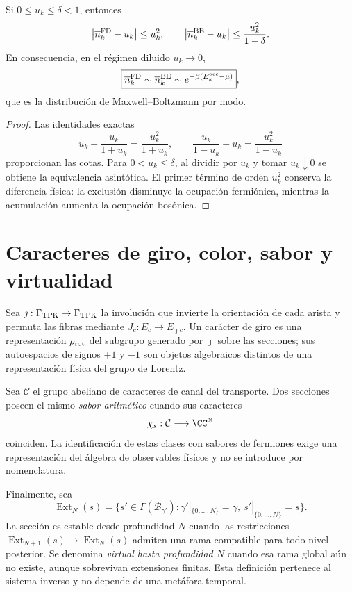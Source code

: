 \begin{theorem}
\label{thm:limite-clasico-fd-be-rev2}
Si \(0\leq u_k\leq\delta<1\), entonces
\[
 \left|\overline n_k^{\rm FD}-u_k\right|\leq u_k^2,
 \qquad
 \left|\overline n_k^{\rm BE}-u_k\right|
 \leq\frac{u_k^2}{1-\delta}.
\]
En consecuencia, en el régimen diluido \(u_k\to0\),
\[
 \boxed{
 \overline n_k^{\rm FD}\sim
 \overline n_k^{\rm BE}\sim
 e^{-\beta(E_k^{\rm occ}-\mu)}} ,
\]
que es la distribución de Maxwell--Boltzmann por modo.
\end{theorem}

\begin{proof}
Las identidades exactas
\[
 u_k-\frac{u_k}{1+u_k}=\frac{u_k^2}{1+u_k},
 \qquad
 \frac{u_k}{1-u_k}-u_k=\frac{u_k^2}{1-u_k}
\]
proporcionan las cotas. Para \(0<u_k\leq\delta\), al dividir por \(u_k\) y
tomar \(u_k\downarrow0\) se obtiene
la equivalencia asintótica. El primer término de orden \(u_k^2\) conserva la
diferencia física: la exclusión disminuye la ocupación fermiónica, mientras
la acumulación aumenta la ocupación bosónica.
\end{proof}

\section{Caracteres de giro, color, sabor y virtualidad}

Sea \(\jmath:\Gamma_{\rm TPK}\to\Gamma_{\rm TPK}\) la involución que invierte
la orientación de cada arista y permuta las fibras mediante
\(J_c:E_c\to E_{\jmath c}\). Un carácter de giro es una representación
\(\rho_{\rm rot}\) del subgrupo generado por \(\jmath\) sobre las secciones;
sus autoespacios de signos \(+1\) y \(-1\) son objetos algebraicos distintos
de una representación física del grupo de Lorentz.

Sea \(\mathcal C\) el grupo abeliano de caracteres de canal del transporte.
Dos secciones poseen el mismo \emph{sabor aritmético} cuando sus caracteres
\[
 \chi_s:\mathcal C\longrightarrow\CC^\times
\]
coinciden. La identificación de estas clases con sabores de fermiones exige
una representación del álgebra de observables físicos y no se introduce por
nomenclatura.

Finalmente, sea
\[
 \operatorname{Ext}_N(s)=
 \{s'\in\Gamma(\mathcal B_{\gamma'}):
 \gamma'|_{\{0,\ldots,N\}}=\gamma,\ s'|_{\{0,\ldots,N\}}=s\}.
\]
La sección es estable desde profundidad \(N\) cuando las restricciones
\(\operatorname{Ext}_{N+1}(s)\to\operatorname{Ext}_N(s)\) admiten una rama
compatible para todo nivel posterior. Se denomina \emph{virtual hasta
profundidad \(N\)} cuando esa rama global aún no existe, aunque sobrevivan
extensiones finitas. Esta definición pertenece al sistema inverso y no
depende de una metáfora temporal.

